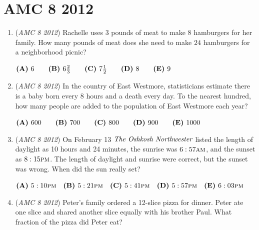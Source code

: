 \section{AMC 8 2012}
        \begin{enumerate}
        	\item (\textit{AMC 8 2012}) Rachelle uses $3$ pounds of meat to make $8$ hamburgers for her family. How many pounds of meat does she need to make $24$ hamburgers for a neighborhood picnic?


 $\textbf{(A)}\hspace{.05in}6\qquad\textbf{(B)}\hspace{.05in}6\frac{2}3\qquad\textbf{(C)}\hspace{.05in}7\frac{1}2\qquad\textbf{(D)}\hspace{.05in}8\qquad\textbf{(E)}\hspace{.05in}9$


	\item (\textit{AMC 8 2012}) In the country of East Westmore, statisticians estimate there is a baby born every $8$ hours and a death every day. To the nearest hundred, how many people are added to the population of East Westmore each year?


 $\textbf{(A)}\hspace{.05in}600\qquad\textbf{(B)}\hspace{.05in}700\qquad\textbf{(C)}\hspace{.05in}800\qquad\textbf{(D)}\hspace{.05in}900\qquad\textbf{(E)}\hspace{.05in}1000$


	\item (\textit{AMC 8 2012}) On February 13 $\emph{The Oshkosh Northwester}$ listed the length of daylight as 10 hours and 24 minutes, the sunrise was $6:57\textsc{am}$, and the sunset as $8:15\textsc{pm}$. The length of daylight and sunrise were correct, but the sunset was wrong. When did the sun really set?


 $\textbf{(A)}\hspace{.05in}5:10\textsc{pm}\quad\textbf{(B)}\hspace{.05in}5:21\textsc{pm}\quad\textbf{(C)}\hspace{.05in}5:41\textsc{pm}\quad\textbf{(D)}\hspace{.05in}5:57\textsc{pm}\quad\textbf{(E)}\hspace{.05in}6:03\textsc{pm}$


	\item (\textit{AMC 8 2012}) Peter's family ordered a 12-slice pizza for dinner. Peter ate one slice and shared another slice equally with his brother Paul. What fraction of the pizza did Peter eat?



\end{enumerate}

